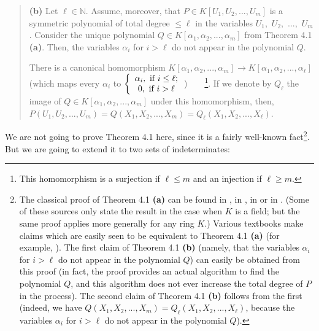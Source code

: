 \documentclass[numbers=enddot,12pt,final,onecolumn,notitlepage]{scrartcl}%
\begin{document}
\begin{quote}
\textbf{(b)} Let $\ell\in\mathbb{N}$. Assume, moreover, that $P\in K\left[
U_{1},U_{2},...,U_{m}\right]  $ is a symmetric polynomial of total degree
$\leq\ell$ in the variables $U_{1},$ $U_{2},$ $...,$ $U_{m}$. Consider the
unique polynomial $Q\in K\left[  \alpha_{1},\alpha_{2},...,\alpha_{m}\right]
$ from Theorem 4.1 \textbf{(a)}. Then, the variables $\alpha_{i}$ for $i>\ell$
do not appear in the polynomial $Q$.

There is a canonical homomorphism $K\left[  \alpha_{1},\alpha_{2}%
,...,\alpha_{m}\right]  \rightarrow K\left[  \alpha_{1},\alpha_{2}%
,...,\alpha_{\ell}\right]  $ (which maps every $\alpha_{i}$ to $\left\{
\begin{array}
[c]{c}%
\alpha_{i},\text{ if }i\leq\ell;\\
0,\text{ if }i>\ell
\end{array}
\right.  $)\ \ \ \ \footnote{This homomorphism is a surjection if $\ell\leq m$
and an injection if $\ell\geq m$.}. If we denote by $Q_{\ell}$ the image of
$Q\in K\left[  \alpha_{1},\alpha_{2},...,\alpha_{m}\right]  $ under this
homomorphism, then, $P\left(  U_{1},U_{2},...,U_{m}\right)  =Q\left(
X_{1},X_{2},...,X_{m}\right)  =Q_{\ell}\left(  X_{1},X_{2},...,X_{\ell
}\right)  $.
\end{quote}

We are not going to prove Theorem 4.1 here, since it is a fairly well-known
fact\footnote{The classical proof of Theorem 4.1 \textbf{(a)} can be found in
\cite[proof of Theorem 1]{BluCos16}, in \cite[Remark 4.16]{Neusel07}, in
\cite[\S 1.1]{Smith95} or in \cite[Chapter 7, \S 1, proof of Theorem
3]{CoLiOS15}. (Some of these sources only state the result in the case when
$K$ is a field; but the same proof applies more generally for any ring $K$.)
Various textbooks make claims which are easily seen to be equivalent to
Theorem 4.1 \textbf{(a)} (for example, \cite[Theorems 3.4 and 3.5]%
{Newman2012}). The first claim of Theorem 4.1 \textbf{(b)} (namely, that the
variables $\alpha_{i}$ for $i>\ell$ do not appear in the polynomial $Q$) can
easily be obtained from this proof (in fact, the proof provides an actual
algorithm to find the polynomial $Q$, and this algorithm does not ever
increase the total degree of $P$ in the process). The second claim of Theorem
4.1 \textbf{(b)} follows from the first (indeed, we have $Q\left(  X_{1}%
,X_{2},...,X_{m}\right)  =Q_{\ell}\left(  X_{1},X_{2},...,X_{\ell}\right)  $,
because the variables $\alpha_{i}$ for $i>\ell$ do not appear in the
polynomial $Q$).}. But we are going to extend it to two sets of indeterminates:
\end{document}
